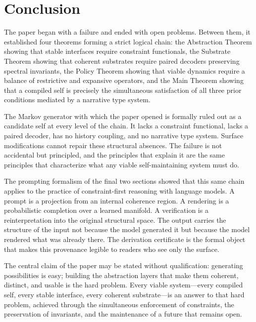 \documentclass[12pt, a4paper]{article}
\theoremstyle{plain}
\theoremstyle{definition}
\theoremstyle{remark}
\begin{document}
\section*{Conclusion}

The paper began with a failure and ended with open problems. Between them, it established four theorems forming a strict logical chain: the Abstraction Theorem showing that stable interfaces require constraint functionals, the Substrate Theorem showing that coherent substrates require paired decoders preserving spectral invariants, the Policy Theorem showing that viable dynamics require a balance of restrictive and expansive operators, and the Main Theorem showing that a compiled self is precisely the simultaneous satisfaction of all three prior conditions mediated by a narrative type system.

The Markov generator with which the paper opened is formally ruled out as a candidate self at every level of the chain. It lacks a constraint functional, lacks a paired decoder, has no history coupling, and no narrative type system. Surface modifications cannot repair these structural absences. The failure is not accidental but principled, and the principles that explain it are the same principles that characterize what any viable self-maintaining system must do.

The prompting formalism of the final two sections showed that this same chain applies to the practice of constraint-first reasoning with language models. A prompt is a projection from an internal coherence region. A rendering is a probabilistic completion over a learned manifold. A verification is a reinterpretation into the original structural space. The output carries the structure of the input not because the model generated it but because the model rendered what was already there. The derivation certificate is the formal object that makes this provenance legible to readers who see only the surface.

The central claim of the paper may be stated without qualification: generating possibilities is easy; building the abstraction layers that make them coherent, distinct, and usable is the hard problem. Every viable system---every compiled self, every stable interface, every coherent substrate---is an answer to that hard problem, achieved through the simultaneous enforcement of constraints, the preservation of invariants, and the maintenance of a future that remains open.
\end{document}
